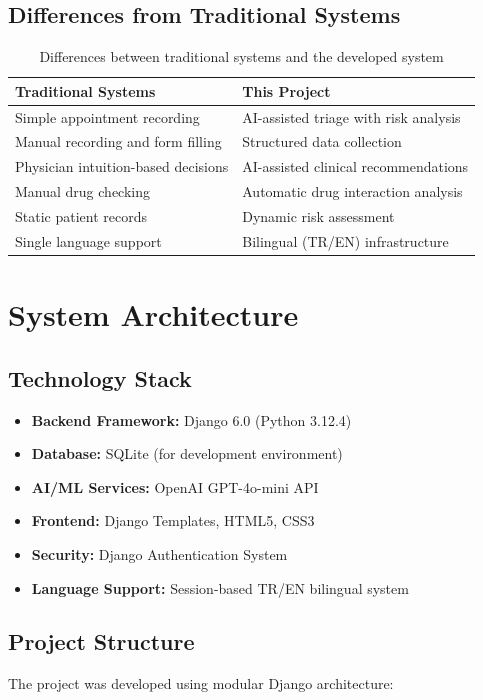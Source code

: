 \documentclass[12pt,a4paper]{article}
\begin{document}
\subsection{Differences from Traditional Systems}
\begin{table}[h!]
\centering
\begin{tabular}{|p{5cm}|p{5cm}|}
\hline
\textbf{Traditional Systems} & \textbf{This Project} \\
\hline
Simple appointment recording & AI-assisted triage with risk analysis \\
\hline
Manual recording and form filling & Structured data collection \\
\hline
Physician intuition-based decisions & AI-assisted clinical recommendations \\
\hline
Manual drug checking & Automatic drug interaction analysis \\
\hline
Static patient records & Dynamic risk assessment \\
\hline
Single language support & Bilingual (TR/EN) infrastructure \\
\hline
\end{tabular}
\caption{Differences between traditional systems and the developed system}
\end{table}

\section{System Architecture}

\subsection{Technology Stack}
\begin{itemize}
    \item \textbf{Backend Framework:} Django 6.0 (Python 3.12.4)
    \item \textbf{Database:} SQLite (for development environment)
    \item \textbf{AI/ML Services:} OpenAI GPT-4o-mini API
    \item \textbf{Frontend:} Django Templates, HTML5, CSS3
    \item \textbf{Security:} Django Authentication System
    \item \textbf{Language Support:} Session-based TR/EN bilingual system
\end{itemize}

\subsection{Project Structure}
The project was developed using modular Django architecture:
\end{document}
